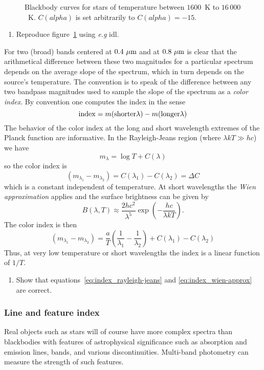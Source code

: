 \documentclass{article}
\newcommand{\be}{\begin{equation}}
\newcommand{\ee}{\end{equation}}
\begin{document}
\begin{figure}[th!]
  \centering
  \caption{Blackbody curves for stars of temperature between $1600$~K
    to $16\,000$~K. $C(alpha)$ is set arbitrarily to $C(alpha)=-15$.}
  \label{fig:color_index}
\end{figure}


\begin{enumerate}
\setcounter{enumi}{\value{count}}
\item Reproduce figure~\ref{fig:color_index} using {\it e.g} {\sc idl}.
\setcounter{count}{\value{enumi}} 
\end{enumerate}

For two (broad) bands centered at $0.4~\mu{\rm m}$ and at $0.8~\mu{\rm
  m}$ is clear that the arithmetical difference between these two
magnitudes for a particular spectrum depends on the average slope of
the spectrum, which in turn depends on the source's temperature. The
convention is to speak of the difference between any two bandpass
magnitudes used to sample the slope of the spectrum as a {\it color
  index}. By convention one computes the index in the sense
\[
{\rm index}=m({\rm shorter}\lambda)-m({\rm longer}\lambda)
\]
The behavior of the color index at the long and short wavelength
extremes of the Planck function are informative. In the Rayleigh-Jeans
region (where $\lambda kT\gg hc$) we have 
\[
m_\lambda=\log{T}+C(\lambda)
\]
so the color index is
\be
(m_{\lambda_1}-m_{\lambda_2})=C(\lambda_1)-C(\lambda_2)=\Delta C
\label{eq:index_rayleigh-jeans}
\ee
which is a constant independent of temperature. At short wavelengths
the {\it Wien approximation} applies and the surface brightness can be
given by 
\[
B(\lambda,T)\approx
\frac{2hc^2}{\lambda^5}\exp\left(-\frac{hc}{\lambda kT}\right).
\]
The color index is then
\be
(m_{\lambda_1}-m_{\lambda_2})=\frac{a}{T}\left(\frac{1}{\lambda_1}-\frac{1}{\lambda_2}\right)+C(\lambda_1)-C(\lambda_2)
\label{eq:index_wien-approx}
\ee
Thus, at very low temperature or short wavelengths the index is a
linear function of $1/T$. 

\begin{enumerate}
\setcounter{enumi}{\value{count}}
\item Show that equations~\ref{eq:index_rayleigh-jeans} and
  \ref{eq:index_wien-approx} are correct.
\setcounter{count}{\value{enumi}} 
\end{enumerate}

\subsubsection{Line and feature index}
Real objects such as stars will of course have more complex spectra
than blackbodies with features of astrophysical significance such as
absorption and emission lines, bands, and various
discontinuities. Multi-band photometry can measure the strength of
such features. 
\end{document}
